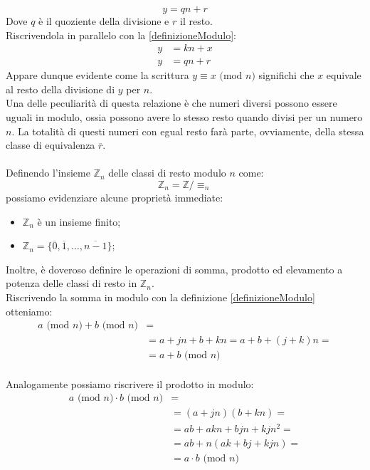 \documentclass[a4paper,12pt]{article}
\begin{document}
\begin{equation}
    y=qn+r
\end{equation}
Dove $q$ è il quoziente della divisione e $r$ il resto.\\
Riscrivendola in parallelo con la \eqref{definizioneModulo}:
\begin{equation} \label{parallelo}
\begin{split}
y & = kn+x \\
y & = qn+r
\end{split}
\end{equation}
Appare dunque evidente come la scrittura $y \equiv x \text{ (mod $n$)}$ significhi che $x$ equivale al resto della divisione di $y$ per $n$.\\
Una delle peculiarità di questa relazione è che numeri diversi possono essere uguali in modulo, ossia possono avere lo stesso resto quando divisi per un numero $n$. La totalità di questi numeri con egual resto farà parte, ovviamente, della stessa classe di equivalenza $\overline{r}$.\\\\
Definendo l'insieme $\mathbb{Z}_n$ delle classi di resto modulo $n$ come:
\begin{equation}\label{Zn}
\mathbb{Z}_n = \mathbb{Z}/\equiv_n
\end{equation}
possiamo evidenziare alcune proprietà immediate:
\begin{itemize}
    \item $\mathbb{Z}_n$ è un insieme finito;
    \item $\mathbb{Z}_n=\{ \overline{0},\overline{1},\hdots,\overline{n-1}\}$;
\end{itemize}
Inoltre, è doveroso definire le operazioni di somma, prodotto ed elevamento a potenza delle classi di resto in $\mathbb{Z}_n$.\\
Riscrivendo la somma in modulo con la definizione \eqref{definizioneModulo} otteniamo:
\begin{equation}
\begin{split}
a \text{ (mod $n$)} + b \text{ (mod $n$)} & = \\
& = a+jn + b + kn = a+b + (j+k)n =\\
& = a+b\text{ (mod $n$)}
\end{split}
\end{equation}\\
Analogamente possiamo riscrivere il prodotto in modulo:
\begin{equation}
\begin{split}
a \text{ (mod $n$)} \cdot b \text{ (mod $n$)} & = \\
& = (a+jn) (b + kn) =\\
& = ab +akn +bjn +kjn^2=\\
& = ab + n(ak+bj+kjn)=\\
& = a\cdot b\text{ (mod $n$)}
\end{split}
\end{equation}
\end{document}
